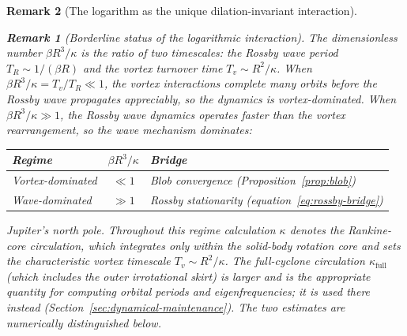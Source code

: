 \documentclass[12pt, a4paper]{article}
\newtheorem{remark}{Remark}[section]
\numberwithin{equation}{section}
\begin{document}
\begin{remark}[The logarithm as the unique dilation-invariant interaction]
\begin{remark}[Borderline status of the logarithmic interaction]
The dimensionless number $\beta R^3/\kappa$ is the ratio of two
timescales: the Rossby wave period $T_R \sim 1/(\beta R)$ and the
vortex turnover time $T_v \sim R^2/\kappa$.  When
$\beta R^3/\kappa = T_v/T_R \ll 1$, the vortex interactions complete
many orbits before the Rossby wave propagates appreciably, so the
dynamics is vortex-dominated.  When $\beta R^3/\kappa \gg 1$, the
Rossby wave dynamics operates faster than the vortex rearrangement,
so the wave mechanism dominates:
\begin{center}
\begin{tabular}{lcl}
\toprule
Regime & $\beta R^3/\kappa$ & Bridge \\
\midrule
Vortex-dominated & $\ll 1$ & Blob convergence (Proposition~\ref{prop:blob}) \\
Wave-dominated & $\gg 1$ & Rossby stationarity (equation~\eqref{eq:rossby-bridge}) \\
\bottomrule
\end{tabular}
\end{center}

\noindent
\textit{Jupiter's north pole.}
Throughout this regime calculation $\kappa$ denotes the
\emph{Rankine-core} circulation, which integrates only within the
solid-body rotation core and sets the characteristic vortex timescale
$T_v \sim R^2/\kappa$.  The full-cyclone circulation $\kappa_{\mathrm{full}}$
(which includes the outer irrotational skirt) is larger and is the
appropriate quantity for computing orbital periods and eigenfrequencies;
it is used there instead (Section~\ref{sec:dynamical-maintenance}).
The two estimates are numerically distinguished below.


\end{remark}
\end{remark}
\end{document}
